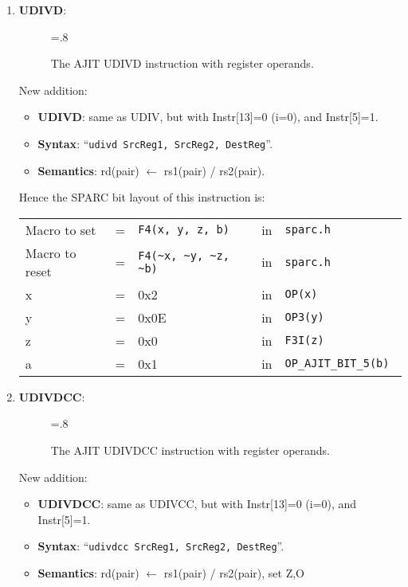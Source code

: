 \begin{enumerate}
\item \textbf{UDIVD}:\\
  \begin{center}
    \begin{figure}[h]
      \centering
      \epsfxsize=.8\linewidth
      \caption{The AJIT UDIVD instruction  with register operands.}
      \label{fig:ajit:udivd:insn}
    \end{figure}
  \end{center}
  New addition:
  \begin{itemize}
  \item []\textbf{UDIVD}: same as UDIV, but with Instr[13]=0 (i=0), and
    Instr[5]=1.
  \item []\textbf{Syntax}: ``\texttt{udivd  SrcReg1, SrcReg2, DestReg}''.
  \item []\textbf{Semantics}: rd(pair) $\leftarrow$ rs1(pair) / rs2(pair).
  \end{itemize}

  Hence the SPARC bit layout of this instruction is:

  \begin{tabular}[h]{lclcl}
    Macro to set   &=& \verb|F4(x, y, z, b)|     &in& \verb|sparc.h|           \\
    Macro to reset &=& \verb|F4(~x, ~y, ~z, ~b)| &in& \verb|sparc.h|           \\
    x              &=& 0x2                       &in& \verb|OP(x) |            \\
    y              &=& 0x0E                      &in& \verb|OP3(y) |           \\
    z              &=& 0x0                       &in& \verb|F3I(z) |           \\
    a              &=& 0x1                       &in& \verb|OP_AJIT_BIT_5(b) |
  \end{tabular}

\item \textbf{UDIVDCC}:\\
  \begin{center}
    \begin{figure}[h]
      \centering
      \epsfxsize=.8\linewidth
      \caption{The AJIT UDIVDCC instruction  with register operands.}
      \label{fig:ajit:udivdcc:insn}
    \end{figure}
  \end{center}
  New addition:
  \begin{itemize}
  \item []\textbf{UDIVDCC}: same as UDIVCC, but with Instr[13]=0 (i=0), and
    Instr[5]=1.
  \item []\textbf{Syntax}: ``\texttt{udivdcc  SrcReg1, SrcReg2, DestReg}''.
  \item []\textbf{Semantics}: rd(pair) $\leftarrow$ rs1(pair) / rs2(pair), set Z,O
  \end{itemize}


\end{enumerate}

